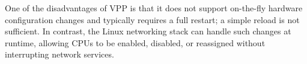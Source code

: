 One of the disadvantages of VPP is that it does not support on-the-fly hardware configuration changes and typically requires a full restart; a simple reload is not sufficient. 
In contrast, the Linux networking stack can handle such changes at runtime, allowing CPUs to be enabled, disabled, or reassigned without interrupting network services.


